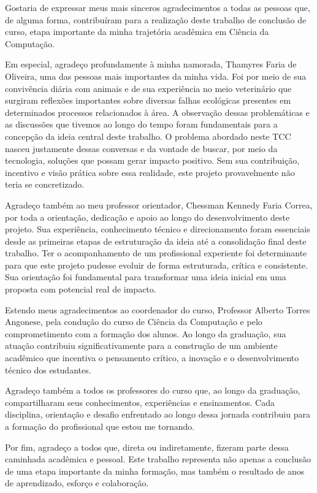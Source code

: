 \documentclass[
	12pt,
	openright,
	oneside,
	a4paper,
	chapter=TITLE,
	section=TITLE,
	subsection=TITLE,
	subsubsection=TITLE,
	english,
	brazil
	]{abntex2}
\begin{document}
\begin{agradecimentos}

Gostaria de expressar meus mais sinceros agradecimentos a todas as pessoas que, de alguma forma, contribuíram para a realização deste trabalho de conclusão de curso, etapa importante da minha trajetória acadêmica em Ciência da Computação.

Em especial, agradeço profundamente à minha namorada, Thamyres Faria de Oliveira, uma das pessoas mais importantes da minha vida. Foi por meio de sua convivência diária com animais e de sua experiência no meio veterinário que surgiram reflexões importantes sobre diversas falhas ecológicas presentes em determinados processos relacionados à área. A observação dessas problemáticas e as discussões que tivemos ao longo do tempo foram fundamentais para a concepção da ideia central deste trabalho. O problema abordado neste TCC nasceu justamente dessas conversas e da vontade de buscar, por meio da tecnologia, soluções que possam gerar impacto positivo. Sem sua contribuição, incentivo e visão prática sobre essa realidade, este projeto provavelmente não teria se concretizado.

Agradeço também ao meu professor orientador, Chessman Kennedy Faria Correa, por toda a orientação, dedicação e apoio ao longo do desenvolvimento deste projeto. Sua experiência, conhecimento técnico e direcionamento foram essenciais desde as primeiras etapas de estruturação da ideia até a consolidação final deste trabalho. Ter o acompanhamento de um profissional experiente foi determinante para que este projeto pudesse evoluir de forma estruturada, crítica e consistente. Sua orientação foi fundamental para transformar uma ideia inicial em uma proposta com potencial real de impacto.

Estendo meus agradecimentos ao coordenador do curso, Professor Alberto Torres Angonese, pela condução do curso de Ciência da Computação e pelo comprometimento com a formação dos alunos. Ao longo da graduação, sua atuação contribuiu significativamente para a construção de um ambiente acadêmico que incentiva o pensamento crítico, a inovação e o desenvolvimento técnico dos estudantes.

Agradeço também a todos os professores do curso que, ao longo da graduação, compartilharam seus conhecimentos, experiências e ensinamentos. Cada disciplina, orientação e desafio enfrentado ao longo dessa jornada contribuiu para a formação do profissional que estou me tornando.

Por fim, agradeço a todos que, direta ou indiretamente, fizeram parte dessa caminhada acadêmica e pessoal. Este trabalho representa não apenas a conclusão de uma etapa importante da minha formação, mas também o resultado de anos de aprendizado, esforço e colaboração.

\end{agradecimentos}
\end{document}

